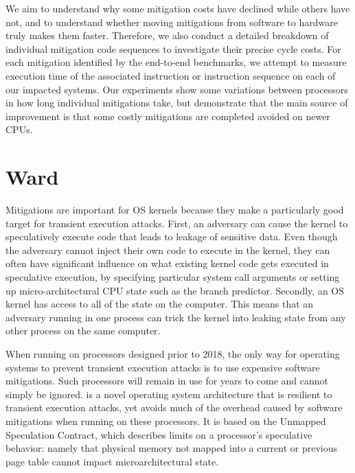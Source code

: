 We aim to understand why some mitigation costs have declined while others have not, and to understand whether moving mitigations from software to hardware truly makes them faster.
Therefore, we also conduct a detailed breakdown of individual mitigation code sequences to investigate their precise cycle costs.
For each mitigation identified by the end-to-end benchmarks, we attempt to measure execution time of the associated instruction or instruction sequence on each of our impacted systems.
Our experiments show some variations between processors in how long individual mitigations take, but demonstrate that the main source of improvement is that some costly mitigations are completed avoided on newer CPUs. 

\section{Ward}
Mitigations are important for OS kernels because they make a particularly good target for transient execution attacks.
First, an adversary can cause the kernel to speculatively execute code that
leads to leakage of sensitive data. Even though the adversary cannot
inject their own code to execute in the kernel, they can often
have significant influence on what existing kernel code gets executed in
speculative execution, by specifying particular system call arguments or
setting up micro-architectural CPU state such as the branch predictor.
Secondly, an OS kernel has access to all of the state
on the computer. This means that an adversary running in one process
can trick the kernel into leaking state from any other process on the
same computer.

When running on processors designed prior to 2018, the only way for operating systems to prevent transient execution attacks is to use expensive software mitigations.
Such processors will remain in use for years to come and cannot simply be ignored.
\sys is a novel operating system architecture that is resilient to transient execution attacks, yet avoids much of the overhead caused by software mitigations when running on these processors.
It is based on the Unmapped Speculation Contract, which describes limits on a processor's speculative behavior: namely that physical memory not mapped into a current or previous page table cannot impact microarchitectural state.

